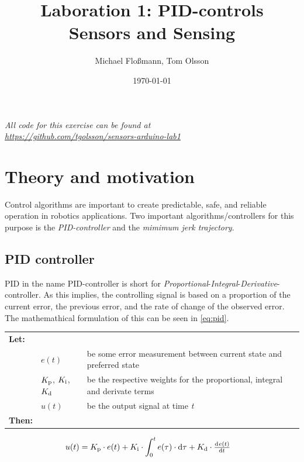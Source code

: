 \documentclass[11pt]{article}
\title{Laboration 1: PID-controls\\ {\small Sensors and Sensing}}
\author{Michael Flo{\ss}mann, Tom Olsson}
\date{\today}
\begin{document}
\maketitle %
\begin{center}
  \emph{All code for this exercise can be found at \\ \url{https://github.com/tgolsson/sensors-arduino-lab1}}
\end{center}
\lstlistoflistings %
\listoffigures %
\listoftables
\lstset{ matchrangestart=t} %
\section{Theory and motivation}
Control algorithms are important to create predictable, safe, and reliable operation in robotics applications. Two important algorithms/controllers for this purpose is the \emph{PID-controller} and the \emph{mimimum jerk trajectory}. 

\subsection{PID controller}
PID in the name PID-controller is short for \emph{Proportional}-\emph{Integral}-\emph{Derivative}-controller. As this implies, the controlling signal is based on a proportion of the current error, the previous error, and the rate of change of the observed error. The mathemathical formulation of this can be seen in \vref{eq:pid}.\par \vspace{10pt}
{\footnotesize
  \begin{tabular}{l l l}
    \textbf{Let:} \\
 &$e(t)$ &be some error measurement between current state and preferred state\\
 &$K_\textup{p}$, $K_\textup{i}$, $K_\textup{d}$ &be the respective weights for the proportional, integral and derivate terms \\
 &$u(t)$ &be the output signal at time \emph{t} \\
    \textbf{Then:}
  \end{tabular}
  \begin{align}
    u(t) &= \di{K}{p}\cdot e(t) + \di{K}{i} \cdot\int_{0}^{t}e(\tau)\cdot \dif\tau + \di{K}{d} \cdot \od{e(t)}{t}\label{eq:pid}
  \end{align}}
\par
\end{document}
